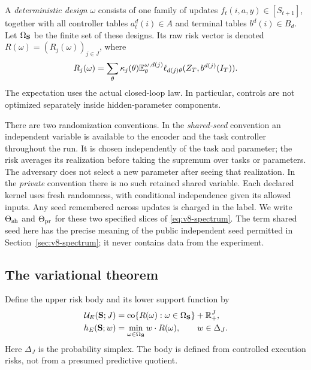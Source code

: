 A \emph{deterministic design} $\omega$ consists of one family of updates
$f_t(i,a,y)\in[S_{t+1}]$, together with all controller tables
$a_t^d(i)\in A$ and terminal tables $b^d(i)\in B_d$. Let
$\Omega_{\bf S}$ be the finite set of these designs. Its raw risk vector
is denoted $R(\omega)=(R_j(\omega))_{j\in J}$, where
\begin{equation}
 R_j(\omega)=\sum_{\theta}\kappa_j(\theta)
       \mathbb E_\theta^{\omega,d(j)}\ell_{d(j)\theta}(Z_T,b^{d(j)}(I_T)).
 \label{eq:v9-riskrows}
\end{equation}
The expectation uses the actual closed-loop law. In particular, controls
are not optimized separately inside hidden-parameter components.

There are two randomization conventions. In the \emph{shared-seed}
convention an independent variable is available to the encoder and the
task controller throughout the run. It is chosen independently of the
task and parameter; the risk averages its realization before taking the
supremum over tasks or parameters. The adversary does not select a new
parameter after seeing that realization. In the \emph{private}
convention there is no such retained shared variable. Each declared
kernel uses fresh randomness, with conditional independence given its
allowed inputs. Any seed remembered across updates is charged in the
label. We write $\Theta_{\rm sh}$ and $\Theta_{\rm pr}$ for these two
specified slices of \eqref{eq:v8-spectrum}. The term shared seed here
has the precise meaning of the public independent seed permitted in
Section~\ref{sec:v8-spectrum}; it never contains data from the experiment.

\subsection{The variational theorem}
Define the upper risk body and its lower support function by
\begin{align}
 \mathcal U_E({\bf S};J)
   &=\operatorname{co}\{R(\omega):\omega\in\Omega_{\bf S}\}
                                      +\mathbb R_+^J,\label{eq:v9-body}\\
 h_E({\bf S};w)&=\min_{\omega\in\Omega_{\bf S}}w\cdot R(\omega),
                 \qquad w\in\Delta_J.\label{eq:v9-support}
\end{align}
Here $\Delta_J$ is the probability simplex. The body is defined from
controlled execution risks, not from a presumed predictive quotient.


